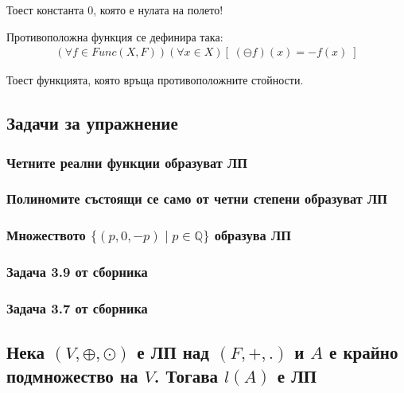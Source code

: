 \documentclass{article}[12pt]
\begin{document}
Тоест константа \(0\), която е нулата на полето!

Противоположна функция се дефинира така:
\begin{align*}
(\forall f \in Func(X, F))(\forall x \in X)[\; (\ominus f)(x) = -f(x) \;]
\end{align*}

Тоест функцията, която връща противоположните стойности.

\subsection{Задачи за упражнение}

\subsubsection{Четните реални функции образуват ЛП}

\subsubsection{Полиномите състоящи се само от четни степени образуват ЛП}

\subsubsection{Множеството \(\{(p, 0, -p) \; | \; p \in \mathbb{Q}\}\) образува ЛП}

\subsubsection{Задача 3.9 от сборника}

\subsubsection{Задача 3.7 от сборника}

\subsection{Нека \((V, \oplus, \odot)\) е ЛП над \((F, +, .)\) и \(A\) е крайно подмножество на \(V\). Тогава \(l(A)\) е ЛП}
\end{document}
